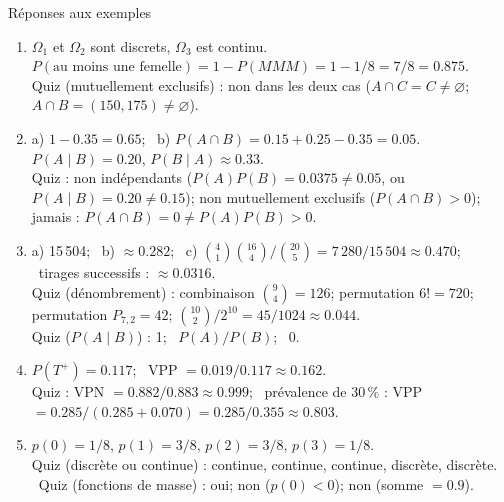 \documentclass{BeamerTemplate}
\begin{document}
\begin{frame}[t]{Réponses aux exemples}
  \scriptsize
  \begin{enumerate}\itemsep 1.2mm
    \item $\Omega_1$ et $\Omega_2$ sont discrets, $\Omega_3$ est continu.
      $P(\text{au moins une femelle}) = 1 - P(MMM) = 1 - 1/8 = 7/8 = 0.875$.\\
      Quiz (mutuellement exclusifs) : non dans les deux cas
      ($A \cap C = C \neq \varnothing$; $A \cap B = (150, 175) \neq \varnothing$).
    \item a) $1 - 0.35 = 0.65$; \ b) $P(A \cap B) = 0.15 + 0.25 - 0.35 = 0.05$.
      \ $P(A \mid B) = 0.20$, $P(B \mid A) \approx 0.33$.\\
      Quiz : non indépendants ($P(A)P(B) = 0.0375 \neq 0.05$, ou
      $P(A \mid B) = 0.20 \neq 0.15$); non mutuellement exclusifs
      ($P(A \cap B) > 0$); jamais : $P(A \cap B) = 0 \neq P(A)P(B) > 0$.
    \item a) 15\,504; \ b) $\approx 0.282$; \
      c) $\binom{4}{1}\binom{16}{4} / \binom{20}{5} = 7\,280 / 15\,504 \approx 0.470$;
      \ tirages successifs : $\approx 0.0316$.\\
      Quiz (dénombrement) : combinaison $\binom{9}{4} = 126$; permutation
      $6! = 720$; permutation $P_{7,2} = 42$;
      $\binom{10}{2} / 2^{10} = 45/1024 \approx 0.044$.\\
      Quiz ($P(A \mid B)$) : 1; \ $P(A)/P(B)$; \ 0.
    \item $P(T^+) = 0.117$; \ VPP $= 0.019/0.117 \approx 0.162$.\\
      Quiz : VPN $= 0.882 / 0.883 \approx 0.999$; \ prévalence de 30\,\% :
      VPP $= 0.285 / (0.285 + 0.070) = 0.285/0.355 \approx 0.803$.
    \item $p(0) = 1/8$, $p(1) = 3/8$, $p(2) = 3/8$, $p(3) = 1/8$.\\
      Quiz (discrète ou continue) : continue, continue, continue, discrète,
      discrète.
      \ Quiz (fonctions de masse) : oui; non ($p(0) < 0$); non (somme $= 0.9$).
  \end{enumerate}
\end{frame}
\end{document}
